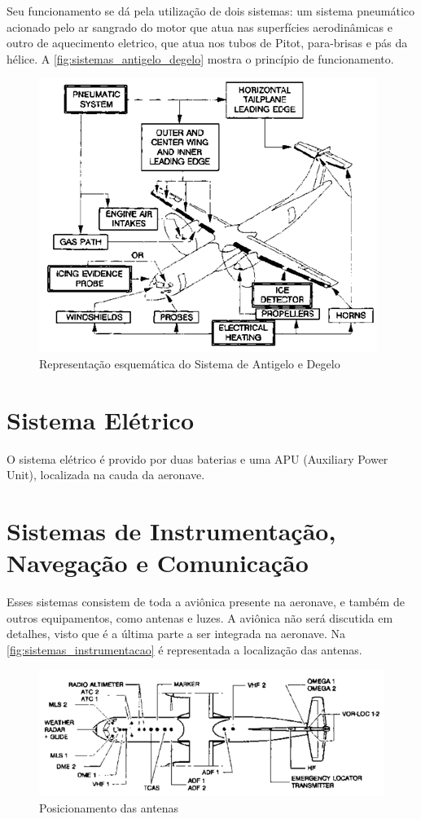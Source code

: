 Seu funcionamento se dá pela utilização de dois sistemas: um sistema pneumático acionado pelo ar sangrado do motor que atua nas superfícies aerodinâmicas e outro de aquecimento eletrico, que atua nos tubos de Pitot, para-brisas e pás da hélice.
A \autoref{fig:sistemas_antigelo_degelo} mostra o princípio de funcionamento.

\begin{figure}
\centering
\includegraphics[width=\textwidth]{images/parte3/sistemas_antigelo_degelo.png}
\caption{Representação esquemática do Sistema de Antigelo e Degelo}
\label{fig:sistemas_antigelo_degelo}
\end{figure}


\section{Sistema Elétrico}

O sistema elétrico é provido por duas baterias e uma APU (Auxiliary Power Unit), localizada na cauda da aeronave.

\section{Sistemas de Instrumentação, Navegação e Comunicação}

Esses sistemas consistem de toda a aviônica presente na aeronave, e também de outros equipamentos, como antenas e luzes.
A aviônica não será discutida em detalhes, visto que é a última parte a ser integrada na aeronave.
Na \autoref{fig:sistemas_instrumentacao} é representada a localização das antenas.

\begin{figure}
\centering
\includegraphics[width=\textwidth]{images/parte3/sistemas_instrumentacao.png}
\caption{Posicionamento das antenas}
\label{fig:sistemas_instrumentacao}
\end{figure}
